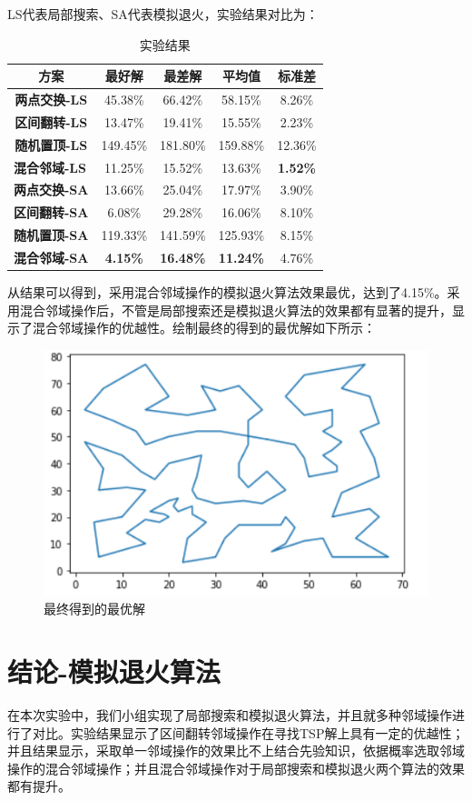 \documentclass[withoutpreface,bwprint]{cumcmthesis} %
\begin{document}
	LS代表局部搜索、SA代表模拟退火，实验结果对比为：
\begin{table}[H]
\centering
\caption{实验结果}
\label{all}
\begin{tabular}{|c|c|c|c|c|}
\hline
\textbf{方案}                            & \textbf{最好解}    & \textbf{最差解}     & \textbf{平均值}     & \textbf{标准差}    \\ \hline
\textbf{两点交换-LS} & 45.38\%  & 66.42\%  & 58.15\%  & 8.26\%  \\ \hline
\textbf{区间翻转-LS} & 13.47\%  & 19.41\%  & 15.55\%  & 2.23\%  \\ \hline
\textbf{随机置顶-LS} & 149.45\% & 181.80\% & 159.88\% & 12.36\% \\ \hline
\multicolumn{1}{|l|}{\textbf{混合邻域-LS}} & 11.25\%         & 15.52\%          & 13.63\%          & \textbf{1.52\%} \\ \hline
\textbf{两点交换-SA} & 13.66\%  & 25.04\%  & 17.97\%  & 3.90\%  \\ \hline
\textbf{区间翻转-SA} & 6.08\%   & 29.28\%  & 16.06\%  & 8.10\%  \\ \hline
\textbf{随机置顶-SA} & 119.33\% & 141.59\% & 125.93\% & 8.15\%  \\ \hline
\multicolumn{1}{|l|}{\textbf{混合邻域-SA}} & \textbf{4.15\%} & \textbf{16.48\%} & \textbf{11.24\%} & 4.76\%          \\ \hline
\end{tabular}
\end{table}

   从结果可以得到，采用混合邻域操作的模拟退火算法效果最优，达到了4.15\%。采用混合邻域操作后，不管是局部搜索还是模拟退火算法的效果都有显著的提升，显示了混合邻域操作的优越性。绘制最终的得到的最优解如下所示：
   \begin{figure}[H]
   		\centering
   		\includegraphics[width=0.5\linewidth]{sa_br}
   		\caption{最终得到的最优解}
   \end{figure}

	
\section{结论-模拟退火算法}
	在本次实验中，我们小组实现了局部搜索和模拟退火算法，并且就多种邻域操作进行了对比。实验结果显示了区间翻转邻域操作在寻找TSP解上具有一定的优越性；并且结果显示，采取单一邻域操作的效果比不上结合先验知识，依据概率选取邻域操作的混合邻域操作；并且混合邻域操作对于局部搜索和模拟退火两个算法的效果都有提升。
	
\end{document}
